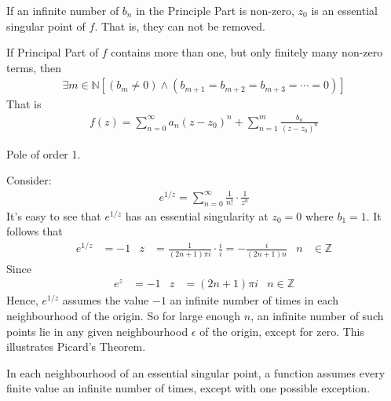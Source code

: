 \documentclass[12pt, english]{book}
\begin{document}
	\begin{definition}
		\label{Essential Singular Points Definition - Complex}
		If an infinite number of \(b_n\) in the Principle Part is non-zero, \(z_0\) is an essential singular point of \(f\). That is, they can not be removed.
	\end{definition}

	\begin{definition}
		\label{Poles of Order m Definition - Complex}
		If Principal Part of \(f\) contains more than one, but only finitely many non-zero terms, then 
		\begin{align*}
			\exists m \in \mathbb{N}[(b_m \neq 0) \land (b_{m+1} = b_{m+2} = b_{m+3} = \cdots = 0)]
		\end{align*} 
		That is 
		\begin{align*}
			f(z) = \sum_{n=0}^{\infty} a_n (z-z_0)^n + \sum_{n=1}^{m} \frac{b_n}{(z-z_0)^n}
		\end{align*}
	\end{definition}

	\begin{definition}
		\label{Simple Pole Definition - Complex}
		Pole of order 1.
	\end{definition}

	\begin{example}
		Consider:
		\begin{align*}
			e^{1/z} = \sum_{n=0}^{\infty} \frac{1}{n!} \cdot \frac{1}{z^n}
		\end{align*}
		It's easy to see that \(e^{1/z}\) has an essential singularity at \(z_0 = 0\) where \(b_1 = 1\). It follows that 
		\begin{align*}
			e^{1/z} &= -1 &
			z &= \frac{1}{(2n + 1)\pi i} \cdot \frac{i}{i} = -\frac{i}{(2n+1)n} & n &\in \mathbb{Z}
		\end{align*}
		Since
		\begin{align*}
			e^{z} &= -1  & z &= (2n+1)\pi i & n \in \mathbb{Z}
		\end{align*}
		Hence, \(e^{1/z}\) assumes the value \(-1\) an infinite number of times in each neighbourhood of the origin. So for large enough \(n\), an infinite number of such points lie in any given neighbourhood \(\epsilon\) of the origin, except for zero. This illustrates Picard's Theorem.
	\end{example}
	
	\begin{theorem}
		In each neighbourhood of an essential singular point, a function assumes every finite value an infinite number of times, except with one possible exception.
	\end{theorem}
\end{document}
